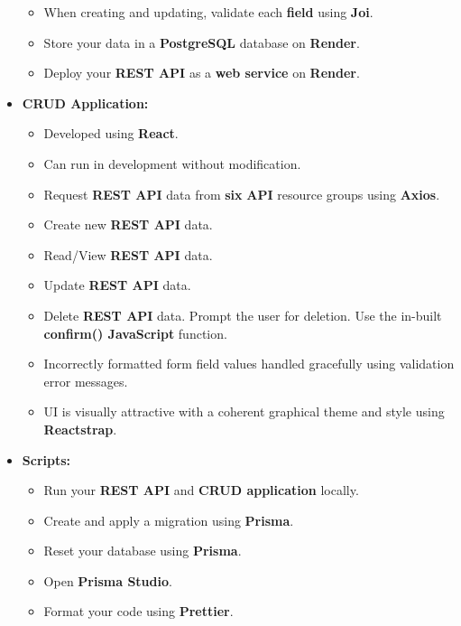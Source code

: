 \documentclass{article}
\begin{document}
\begin{itemize}
\begin{itemize}
		\item When creating and updating, validate each \textbf{field} using \textbf{Joi}. 
		\item Store your data in a \textbf{PostgreSQL} database on \textbf{Render}.
		\item Deploy your \textbf{REST API} as a \textbf{web service} on \textbf{Render}.
	\end{itemize}
	\item \textbf{CRUD Application:}
		\begin{itemize}
		\item Developed using \textbf{React}.
		\item Can run in development without modification.
		\item Request \textbf{REST API} data from \textbf{six} \textbf{API} resource groups using \textbf{Axios}.
		\item Create new \textbf{REST API} data. 
		\item Read/View \textbf{REST API} data.
		\item Update \textbf{REST API} data. 
		\item Delete \textbf{REST API} data. Prompt the user for deletion. Use the in-built \textbf{confirm() JavaScript} function. 
		\item Incorrectly formatted form field values handled gracefully using validation error messages.
		\item UI is visually attractive with a coherent graphical theme and style using \textbf{Reactstrap}.	
	\end{itemize}

	\item \textbf{Scripts:}
	\begin{itemize}
		\item Run your \textbf{REST API} and \textbf{CRUD application} locally.
		\item Create and apply a migration using \textbf{Prisma}.
		\item Reset your database using \textbf{Prisma}.
		\item Open \textbf{Prisma Studio}. 
		\item Format your code using \textbf{Prettier}.
	\end{itemize}
\end{itemize}
\end{document}
